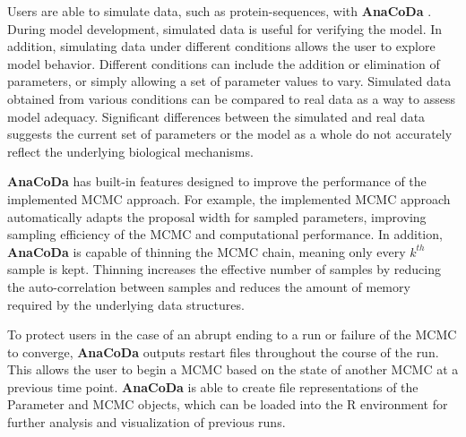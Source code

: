 \documentclass{bioinfo}
\newcommand{\package}{\textbf{AnaCoDa }} %
\begin{document}
Users are able to simulate data, such as protein-sequences, with \package. 
During model development, simulated data is useful for verifying the model. 
In addition, simulating data under different conditions allows the user to explore model behavior. 
Different conditions can include the addition or elimination of parameters, or simply allowing a set of parameter values to vary.
Simulated data obtained from various conditions can be compared to real data as a way to assess model adequacy.
Significant differences between the simulated and real data suggests the current set of parameters or the model as a whole do not accurately reflect the underlying biological mechanisms.

\package has built-in features designed to improve the performance of the implemented MCMC approach. 
For example, the implemented MCMC approach automatically adapts the proposal width for sampled parameters, improving sampling efficiency of the MCMC and computational performance.
In addition, \package is capable of thinning the MCMC chain, meaning only every $k^{th}$ sample is kept. 
Thinning increases the effective number of samples by reducing the auto-correlation between samples and reduces the amount of memory required by the underlying data structures. 

To protect users in the case of an abrupt ending to a run or failure of the MCMC to converge, \package outputs restart files throughout the course of the run. 
This allows the user to begin a MCMC based on the state of another MCMC at a previous time point. 
\package is able to create file representations of the Parameter and MCMC objects, which can be loaded into the R environment for further analysis and visualization of previous runs.
\end{document}
